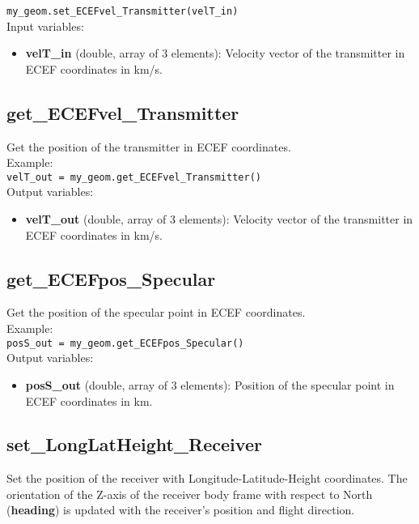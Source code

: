 \texttt{my\_geom.set\_ECEFvel\_Transmitter(velT\_in)}\\

Input variables:
\begin{itemize}
\item {\bf velT\_in} (double, array of 3 elements): Velocity vector of the transmitter in ECEF coordinates in km/s.
\end{itemize}


\subsection{get\_ECEFvel\_Transmitter}

Get the position of the transmitter in ECEF coordinates.\\

Example:\\

\texttt{velT\_out = my\_geom.get\_ECEFvel\_Transmitter()}\\

Output variables:
\begin{itemize}
\item {\bf velT\_out} (double, array of 3 elements): Velocity vector of the transmitter in ECEF coordinates in km/s.
\end{itemize}


\subsection{get\_ECEFpos\_Specular}

Get the position of the specular point in ECEF coordinates.\\

Example:\\

\texttt{posS\_out = my\_geom.get\_ECEFpos\_Specular()}\\

Output variables:
\begin{itemize}
\item {\bf posS\_out} (double, array of 3 elements): Position of the specular point in ECEF coordinates in km.
\end{itemize}


\subsection{set\_LongLatHeight\_Receiver}

Set the position of the receiver with Longitude-Latitude-Height coordinates. The orientation of the Z-axis of the receiver body frame with respect to North ({\bf heading}) is updated with the receiver's position and flight direction.\\

